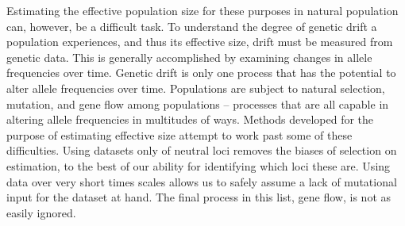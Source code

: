 Estimating the effective population size for these purposes in natural population can, however, be a difficult task. To understand the degree of genetic drift a population experiences, and thus its effective size, drift must be measured from genetic data. This is generally accomplished by examining changes in allele frequencies over time. Genetic drift is only one process that has the potential to alter allele frequencies over time. Populations are subject to natural selection, mutation, and gene flow among populations -- processes that are all capable in altering allele frequencies in multitudes of ways. Methods developed for the purpose of estimating effective size attempt to work past some of these difficulties. Using datasets only of neutral loci removes the biases of selection on estimation, to the best of our ability for identifying which loci these are. Using data over very short times scales allows us to safely assume a lack of mutational input for the dataset at hand. The final process in this list, gene flow, is not as easily ignored.

